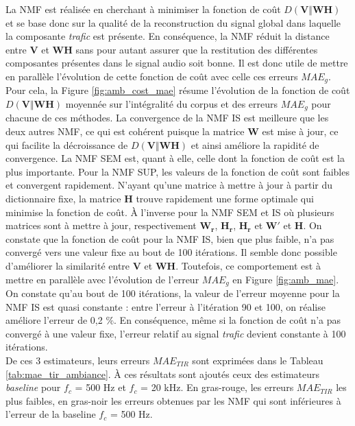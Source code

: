 La NMF est réalisée en cherchant à minimiser la fonction de coût $D(\mathbf{V}\Vert \mathbf{WH})$ et se base donc sur la qualité de la reconstruction du signal global dans laquelle la composante \textit{trafic} est présente. En conséquence, la NMF réduit la distance entre $\mathbf{V}$ et $\mathbf{WH}$ sans pour autant assurer que la restitution des différentes composantes présentes dans le signal audio soit bonne.
Il est donc utile de mettre en parallèle l'évolution de cette fonction de coût avec celle ces erreurs $MAE_g$. 
Pour cela, la Figure \ref{fig:amb_cost_mae} résume l'évolution de la fonction de coût $D(\mathbf{V}\Vert \mathbf{WH})$ moyennée sur l'intégralité du corpus et des erreurs $MAE_g$ pour chacune de ces méthodes. 
La convergence de la NMF IS est meilleure que les deux autres NMF, ce qui est cohérent puisque la matrice $\mathbf{W}$ est mise à jour, ce qui facilite la décroissance de $D(\mathbf{V}\Vert \mathbf{WH})$ et ainsi améliore la rapidité de convergence. La NMF SEM est, quant à elle, celle dont la fonction de coût est la plus importante. Pour la NMF SUP, les valeurs de la fonction de coût sont faibles et convergent rapidement. N'ayant qu'une matrice à mettre à jour à partir du dictionnaire fixe, la matrice $\mathbf{H}$ trouve rapidement une forme optimale qui minimise la fonction de coût. À l'inverse pour la NMF SEM et IS où plusieurs matrices sont à mettre à jour, respectivement $\mathbf{W_r}$, $\mathbf{H_r}$, $\mathbf{H_r}$ et $\mathbf{W'}$ et $\mathbf{H}$. On constate que la fonction de coût pour la NMF IS, bien que plus faible, n'a pas convergé vers une valeur fixe au bout de 100 itérations. Il semble donc possible d'améliorer la similarité entre $\mathbf{V}$ et $\mathbf{WH}$. Toutefois, ce comportement est à mettre en parallèle avec l'évolution de l'erreur $MAE_g$ en Figure \ref{fig:amb_mae}. On constate qu'au bout de 100 itérations, la valeur de l'erreur moyenne pour la NMF IS est quasi constante : entre l'erreur à l'itération 90 et 100, on réalise améliore l'erreur de 0,2 $\%$. En conséquence, même si la fonction de coût n'a pas convergé à une valeur fixe, l'erreur relatif au signal \textit{trafic} devient constante à 100 itérations.\\

De ces 3 estimateurs, leurs erreurs $MAE_{TIR}$ sont exprimées dans le Tableau \ref{tab:mae_tir_ambiance}. À ces résultats sont ajoutés ceux des estimateurs \textit{baseline} pour $f_c$ = 500 Hz et $f_c$ = 20 kHz. En gras-rouge, les erreurs $MAE_{TIR}$ les plus faibles, en gras-noir les erreurs obtenues par les NMF qui sont inférieures à l'erreur de la baseline $f_c$ = 500 Hz.\\

